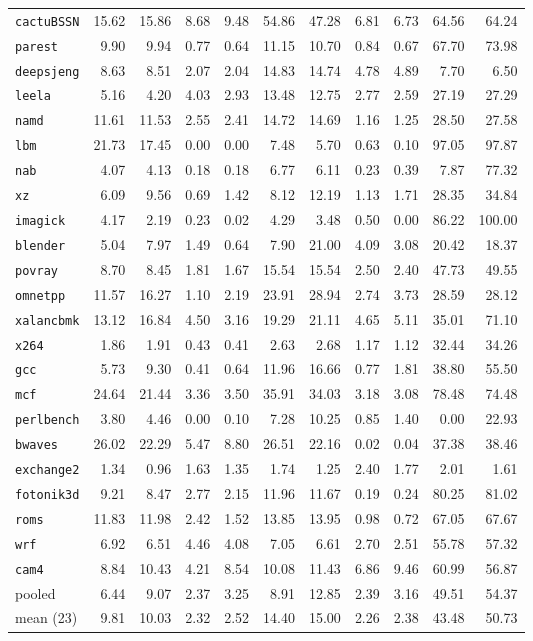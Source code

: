 \documentclass[10pt,a4paper]{article}
\newcommand{\ct}[1]{\texttt{#1}}
\begin{document}
{\begin{longtable}{@{}lrrrrrrrrrr@{}}
\bottomrule
\endlastfoot
\ct{cactuBSSN} & 15.62 & 15.86 & 8.68 & 9.48 & 54.86 & 47.28 & 6.81 & 6.73 & 64.56 & 64.24 \\
\ct{parest} & 9.90 & 9.94 & 0.77 & 0.64 & 11.15 & 10.70 & 0.84 & 0.67 & 67.70 & 73.98 \\
\ct{deepsjeng} & 8.63 & 8.51 & 2.07 & 2.04 & 14.83 & 14.74 & 4.78 & 4.89 & 7.70 & 6.50 \\
\ct{leela} & 5.16 & 4.20 & 4.03 & 2.93 & 13.48 & 12.75 & 2.77 & 2.59 & 27.19 & 27.29 \\
\ct{namd} & 11.61 & 11.53 & 2.55 & 2.41 & 14.72 & 14.69 & 1.16 & 1.25 & 28.50 & 27.58 \\
\ct{lbm} & 21.73 & 17.45 & 0.00 & 0.00 & 7.48 & 5.70 & 0.63 & 0.10 & 97.05 & 97.87 \\
\ct{nab} & 4.07 & 4.13 & 0.18 & 0.18 & 6.77 & 6.11 & 0.23 & 0.39 & 7.87 & 77.32 \\
\ct{xz} & 6.09 & 9.56 & 0.69 & 1.42 & 8.12 & 12.19 & 1.13 & 1.71 & 28.35 & 34.84 \\
\ct{imagick} & 4.17 & 2.19 & 0.23 & 0.02 & 4.29 & 3.48 & 0.50 & 0.00 & 86.22 & 100.00 \\
\ct{blender} & 5.04 & 7.97 & 1.49 & 0.64 & 7.90 & 21.00 & 4.09 & 3.08 & 20.42 & 18.37 \\
\ct{povray} & 8.70 & 8.45 & 1.81 & 1.67 & 15.54 & 15.54 & 2.50 & 2.40 & 47.73 & 49.55 \\
\ct{omnetpp} & 11.57 & 16.27 & 1.10 & 2.19 & 23.91 & 28.94 & 2.74 & 3.73 & 28.59 & 28.12 \\
\ct{xalancbmk} & 13.12 & 16.84 & 4.50 & 3.16 & 19.29 & 21.11 & 4.65 & 5.11 & 35.01 & 71.10 \\
\ct{x264} & 1.86 & 1.91 & 0.43 & 0.41 & 2.63 & 2.68 & 1.17 & 1.12 & 32.44 & 34.26 \\
\ct{gcc} & 5.73 & 9.30 & 0.41 & 0.64 & 11.96 & 16.66 & 0.77 & 1.81 & 38.80 & 55.50 \\
\ct{mcf} & 24.64 & 21.44 & 3.36 & 3.50 & 35.91 & 34.03 & 3.18 & 3.08 & 78.48 & 74.48 \\
\ct{perlbench} & 3.80 & 4.46 & 0.00 & 0.10 & 7.28 & 10.25 & 0.85 & 1.40 & 0.00 & 22.93 \\
\ct{bwaves} & 26.02 & 22.29 & 5.47 & 8.80 & 26.51 & 22.16 & 0.02 & 0.04 & 37.38 & 38.46 \\
\ct{exchange2} & 1.34 & 0.96 & 1.63 & 1.35 & 1.74 & 1.25 & 2.40 & 1.77 & 2.01 & 1.61 \\
\ct{fotonik3d} & 9.21 & 8.47 & 2.77 & 2.15 & 11.96 & 11.67 & 0.19 & 0.24 & 80.25 & 81.02 \\
\ct{roms} & 11.83 & 11.98 & 2.42 & 1.52 & 13.85 & 13.95 & 0.98 & 0.72 & 67.05 & 67.67 \\
\ct{wrf} & 6.92 & 6.51 & 4.46 & 4.08 & 7.05 & 6.61 & 2.70 & 2.51 & 55.78 & 57.32 \\
\ct{cam4} & 8.84 & 10.43 & 4.21 & 8.54 & 10.08 & 11.43 & 6.86 & 9.46 & 60.99 & 56.87 \\
\midrule
pooled & 6.44 & 9.07 & 2.37 & 3.25 & 8.91 & 12.85 & 2.39 & 3.16 & 49.51 & 54.37 \\
mean (23) & 9.81 & 10.03 & 2.32 & 2.52 & 14.40 & 15.00 & 2.26 & 2.38 & 43.48 & 50.73 \\
\end{longtable}
}
\end{document}
